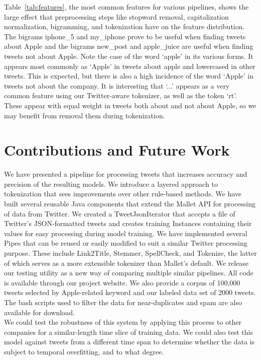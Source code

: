 \documentclass[letterpaper]{article}
\begin{document}
Table~\ref{tab:features}, the most common features for various pipelines, shows the large effect that preprocessing steps like stopword removal, capitalization normalization, bigramming, and tokenization have on the feature distribution. The bigrams iphone\_5 and my\_iphone prove to be useful when finding tweets about Apple and the bigrams new\_post and apple\_juice are useful when finding tweets not about Apple. Note the case of the word `apple' in its various forms. It appears most commonly as `Apple' in tweets about apple and lowercased in other tweets. This is expected, but there is also a high incidence of the word `Apple' in tweets not about the company. It is interesting that `...' appears as a very common feature using our Twitter-aware tokenizer, as well as the token `rt'. These appear with equal weight in tweets both about and not about Apple, so we may benefit from removal them during tokenization.\\ 


\section{Contributions and Future Work}
We have presented a pipeline for processing tweets that increases accuracy and precision of the resulting models. We introduce a layered approach to tokenization that sees improvements over other rule-based methods. We have built several reusable Java components that extend the Mallet API for processing of data from Twitter. We created a TweetJsonIterator that accepts a file of Twitter's JSON-formatted tweets and creates training Instances containing their values for easy processing during model training. We have implemented several Pipes that can be reused or easily modified to suit a similar Twitter processing purpose. These include Link2Title, Stemmer, SpellCheck, and Tokenize, the latter of which serves as a more extensible tokenizer than Mallet's default. We release our testing utility as a new way of comparing multiple similar pipelines. All code is available through our project website. We also provide a corpus of 100,000 tweets selected by Apple-related keyword and our labeled data set of 2000 tweets. The bash scripts used to filter the data for near-duplicates and spam are also available for download.\\

We could test the robustness of this system by applying this process to other companies for a similar-length time slice of training data. We could also test this model against tweets from a different time span to determine whether the data is subject to temporal overfitting, and to what degree.\\
\end{document}
